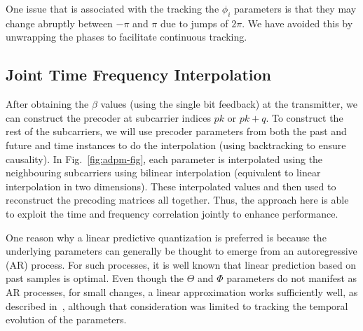 \documentclass[journal,10pt,twocolumn]{IEEEtran}
\begin{document}
One issue that is associated with the tracking the $\phi_i$ parameters
is that they may change abruptly between $-\pi$ and
$\pi$ due to jumps of $2\pi$. We have avoided this by unwrapping the
phases to facilitate continuous tracking.
\subsection{Joint Time Frequency Interpolation}
\label{interp}
After obtaining the $\beta$ values (using the single bit feedback) at
the transmitter, we can construct the precoder at subcarrier indices
$pk$ or $pk+q$. To construct the rest of the subcarriers, we will use
precoder parameters from both the past and future and time instances
to do the interpolation (using backtracking to ensure causality). In
Fig.~\ref{fig:adpm-fig}, each parameter is interpolated using the
neighbouring subcarriers using bilinear interpolation (equivalent to
linear interpolation in two dimensions). These interpolated values and
then used to reconstruct the precoding matrices all together. Thus,
the approach here is able to exploit the time and frequency
correlation jointly to enhance performance.

One reason why a linear predictive quantization is preferred is
because the underlying parameters can generally be thought to emerge
from an autoregressive (AR) process. For such processes, it is well
known that linear prediction based on past samples is optimal. Even
though the $\Theta$ and $\Phi$ parameters do not manifest as AR
processes, for small changes, a linear approximation works
sufficiently well, as described in~\cite{4114278}, although that
consideration was limited to tracking the temporal evolution of the
parameters.
\end{document}
